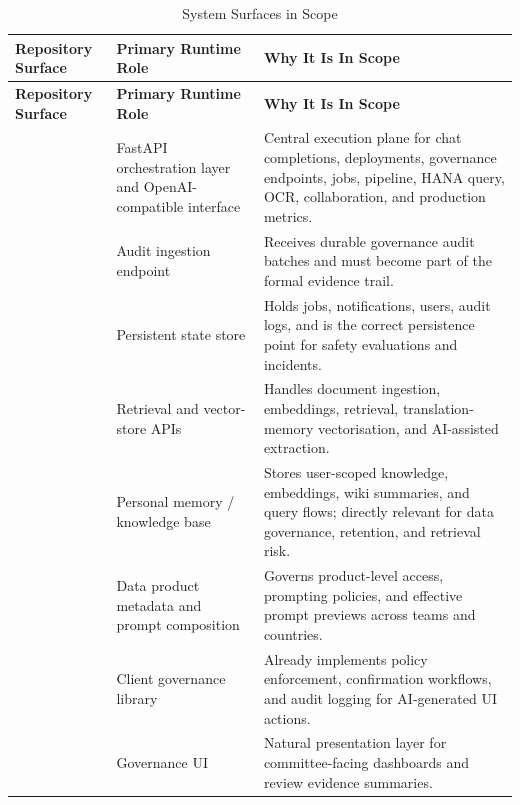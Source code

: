 \documentclass[11pt,a4paper]{article}
\begin{document}
\begin{longtable}{P{0.25\textwidth}P{0.31\textwidth}P{0.34\textwidth}}
\caption{System Surfaces in Scope} \\
\toprule
\textbf{Repository Surface} & \textbf{Primary Runtime Role} & \textbf{Why It Is In Scope} \\
\midrule
\endfirsthead
\toprule
\textbf{Repository Surface} & \textbf{Primary Runtime Role} & \textbf{Why It Is In Scope} \\
\midrule
\endhead
{} & FastAPI orchestration layer and OpenAI-compatible interface & Central execution plane for chat completions, deployments, governance endpoints, jobs, pipeline, HANA query, OCR, collaboration, and production metrics. \\
 & Audit ingestion endpoint & Receives durable governance audit batches and must become part of the formal evidence trail. \\
 & Persistent state store & Holds jobs, notifications, users, audit logs, and is the correct persistence point for safety evaluations and incidents. \\
 & Retrieval and vector-store APIs & Handles document ingestion, embeddings, retrieval, translation-memory vectorisation, and AI-assisted extraction. \\
 & Personal memory / knowledge base & Stores user-scoped knowledge, embeddings, wiki summaries, and query flows; directly relevant for data governance, retention, and retrieval risk. \\
 & Data product metadata and prompt composition & Governs product-level access, prompting policies, and effective prompt previews across teams and countries. \\
 & Client governance library & Already implements policy enforcement, confirmation workflows, and audit logging for AI-generated UI actions. \\
 & Governance UI & Natural presentation layer for committee-facing dashboards and review evidence summaries. \\

\end{longtable}
\end{document}
